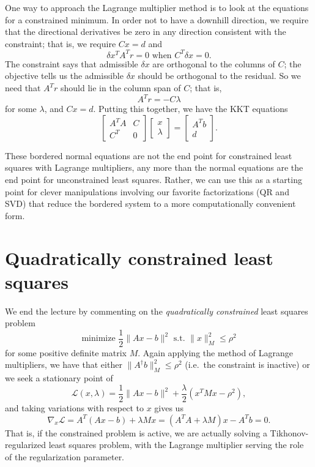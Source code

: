 \documentclass[12pt, leqno]{article} %
\begin{document}
One way to approach the Lagrange multiplier method is to look at the
equations for a constrained minimum.  In order not to have a downhill
direction, we require that the directional derivatives be zero in any
direction consistent with the constraint; that is, we require $Cx = d$
and
\[
  \delta x^T A^T r = 0 \mbox{ when } C^T \delta x = 0.
\]
The constraint says that admissible $\delta x$ are
orthogonal to the columns of $C$; the objective tells us the admissible
$\delta x$ should be orthogonal to the residual.  So we need that $A^T r$
should lie in the column span of $C$; that is,
\[
  A^T r = -C \lambda
\]
for some $\lambda$, and $Cx = d$.  Putting this together,
we have the KKT equations
\[
  \begin{bmatrix}
    A^T A & C \\
    C^T & 0
  \end{bmatrix}
  \begin{bmatrix} x \\ \lambda \end{bmatrix} =
  \begin{bmatrix} A^T b \\ d \end{bmatrix}.
\]

These bordered normal equations are not the end point for constrained
least squares  with Lagrange multipliers, any more than the normal
equations are the end point for unconstrained least squares.  Rather,
we can use this as a starting point for clever manipulations involving
our favorite factorizations (QR and SVD) that reduce the bordered system
to a more computationally convenient form.

\section{Quadratically constrained least squares}

We end the lecture by commenting on the {\em quadratically
  constrained} least squares problem
\[
  \mbox{minimize } \frac{1}{2} \|Ax-b\|^2 \mbox{ s.t.~} \|x\|_M^2 \leq \rho^2
\]
for some positive definite matrix $M$.  Again applying the method of
Lagrange multipliers, we have that either $\|A^\dagger b\|_M^2 \leq \rho^2$ 
(i.e.~the constraint is inactive) or we seek a stationary point of
\[
\mathcal{L}(x, \lambda) =
  \frac{1}{2} \|Ax-b\|^2 + \frac{\lambda}{2} (x^T M x - \rho^2),
\]
and taking variations with respect to $x$ gives us
\[
\nabla_x \mathcal{L} =
  A^T (Ax-b) + \lambda M x = (A^T A + \lambda M) x - A^T b = 0.
\]
That is, if the constrained problem is active, we are actually solving
a Tikhonov-regularized least squares problem, with the Lagrange
multiplier serving the role of the regularization parameter.
\end{document}
